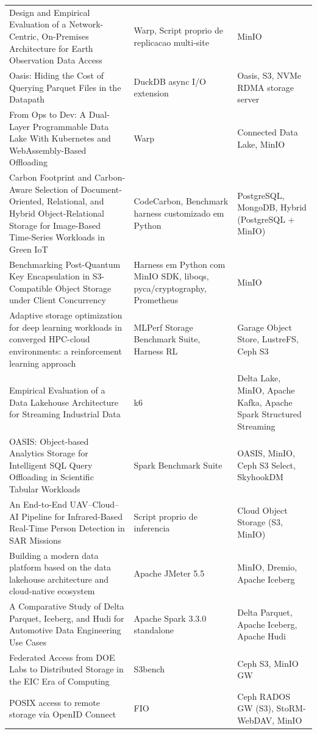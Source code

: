 {\begin{longtable}{@{}p{6.4cm}p{4.3cm}p{4.3cm}@{}}
Design and Empirical Evaluation of a Network-Centric, On-Premises Architecture for Earth Observation Data Access & Warp, Script proprio de replicacao multi-site & MinIO \\
Oasis: Hiding the Cost of Querying Parquet Files in the Datapath & DuckDB async I/O extension & Oasis, S3, NVMe RDMA storage server \\
From Ops to Dev: A Dual-Layer Programmable Data Lake With Kubernetes and WebAssembly-Based Offloading & Warp & Connected Data Lake, MinIO \\
Carbon Footprint and Carbon-Aware Selection of Document-Oriented, Relational, and Hybrid Object-Relational Storage for Image-Based Time-Series Workloads in Green IoT & CodeCarbon, Benchmark harness customizado em Python & PostgreSQL, MongoDB, Hybrid (PostgreSQL + MinIO) \\
Benchmarking Post-Quantum Key Encapsulation in S3-Compatible Object Storage under Client Concurrency & Harness em Python com MinIO SDK, liboqs, pyca/cryptography, Prometheus & MinIO \\
Adaptive storage optimization for deep learning workloads in converged HPC-cloud environments: a reinforcement learning approach & MLPerf Storage Benchmark Suite, Harness RL & Garage Object Store, LustreFS, Ceph S3 \\
Empirical Evaluation of a Data Lakehouse Architecture for Streaming Industrial Data & k6 & Delta Lake, MinIO, Apache Kafka, Apache Spark Structured Streaming \\
OASIS: Object-based Analytics Storage for Intelligent SQL Query Offloading in Scientific Tabular Workloads & Spark Benchmark Suite & OASIS, MinIO, Ceph S3 Select, SkyhookDM \\
An End-to-End UAV–Cloud–AI Pipeline for Infrared-Based Real-Time Person Detection in SAR Missions & Script proprio de inferencia & Cloud Object Storage (S3, MinIO) \\
Building a modern data platform based on the data lakehouse architecture and cloud-native ecosystem & Apache JMeter 5.5 & MinIO, Dremio, Apache Iceberg \\
A Comparative Study of Delta Parquet, Iceberg, and Hudi for Automotive Data Engineering Use Cases & Apache Spark 3.3.0 standalone & Delta Parquet, Apache Iceberg, Apache Hudi \\
Federated Access from DOE Labs to Distributed Storage in the EIC Era of Computing & S3bench & Ceph S3, MinIO GW \\
POSIX access to remote storage via OpenID Connect & FIO & Ceph RADOS GW (S3), StoRM-WebDAV, MinIO \\

\end{longtable}}
